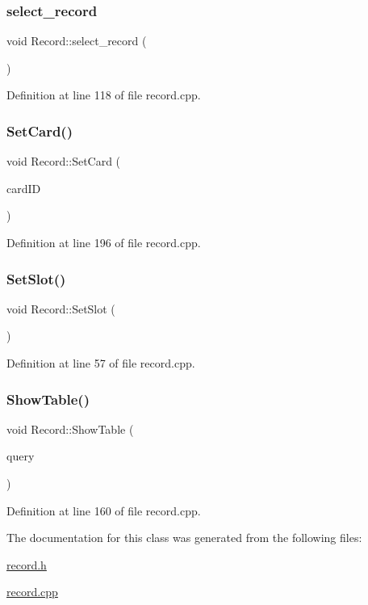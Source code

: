 \subsubsection{\texorpdfstring{select\_record}{select\_record}}
{\footnotesize\ttfamily void Record\+::select\+\_\+record (\begin{DoxyParamCaption}{ }\end{DoxyParamCaption})\hspace{0.3cm}{\ttfamily [slot]}}



Definition at line 118 of file record.\+cpp.

\mbox{\label{class_record_ac08eeade2dbe9fd49ba7d508865f2ab1}} 
\subsubsection{\texorpdfstring{SetCard()}{SetCard()}}
{\footnotesize\ttfamily void Record\+::\+Set\+Card (\begin{DoxyParamCaption}\item[{Q\+String}]{card\+ID }\end{DoxyParamCaption})}



Definition at line 196 of file record.\+cpp.

\mbox{\label{class_record_acc7b3423b809a15465c21f51353392d5}} 
\subsubsection{\texorpdfstring{SetSlot()}{SetSlot()}}
{\footnotesize\ttfamily void Record\+::\+Set\+Slot (\begin{DoxyParamCaption}{ }\end{DoxyParamCaption})}



Definition at line 57 of file record.\+cpp.

\mbox{\label{class_record_aa1e340f0b1a776819d30d23c1424cbd2}} 
\subsubsection{\texorpdfstring{ShowTable()}{ShowTable()}}
{\footnotesize\ttfamily void Record\+::\+Show\+Table (\begin{DoxyParamCaption}\item[{Q\+Sql\+Query}]{query }\end{DoxyParamCaption})}



Definition at line 160 of file record.\+cpp.



The documentation for this class was generated from the following files\+:\begin{DoxyCompactItemize}
\item 
\mbox{\hyperlink{record_8h}{record.\+h}}\item 
\mbox{\hyperlink{record_8cpp}{record.\+cpp}}\end{DoxyCompactItemize}
